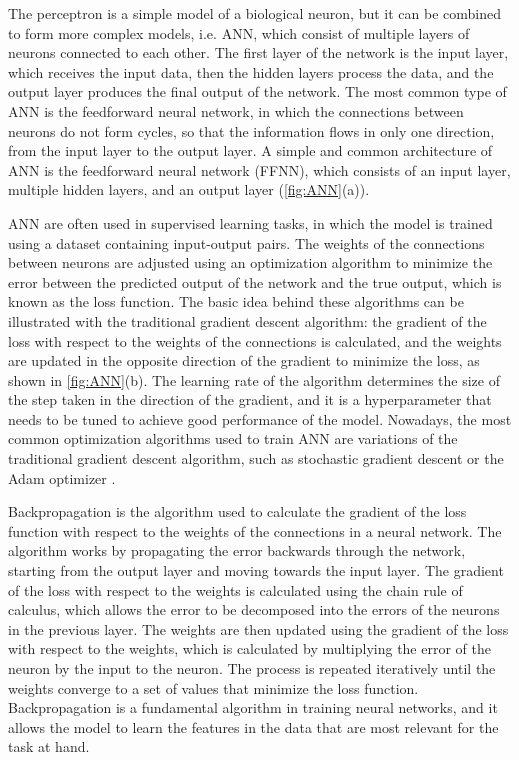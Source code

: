 The perceptron is a simple model of a biological neuron, but it can be
combined to form more complex models, i.e. ANN, which consist of multiple
layers of neurons connected to each other. The first layer of the network is
the input layer, which receives the input data, then the hidden layers process
the data, and the output layer produces the final output of the network. The
most common type of ANN is the feedforward neural network, in which the
connections between neurons do not form cycles, so that the information flows
in only one direction, from the input layer to the output layer. A simple and
common architecture of ANN is the feedforward neural network (FFNN), which
consists of an input layer, multiple hidden layers, and an output layer
(\cref{fig:ANN}(a)).

ANN are often used in supervised learning tasks, in which the model is trained
using a dataset containing input-output pairs. The weights of the connections
between neurons are adjusted using an optimization algorithm to minimize the
error between the predicted output of the network and the true output, which is
known as the loss function. The basic idea behind these algorithms can be
illustrated with the traditional gradient descent algorithm: the gradient of
the loss with respect to the weights of the connections is calculated, and the
weights are updated in the opposite direction of the gradient to minimize the
loss, as shown in \cref{fig:ANN}(b). The learning rate of the algorithm
determines the size of the step taken in the direction of the gradient, and it
is a hyperparameter that needs to be tuned to achieve good performance of the
model. Nowadays, the most common optimization algorithms used to train ANN are
variations of the traditional gradient descent algorithm, such as stochastic
gradient descent or the Adam optimizer \cite{Goodfellow2016}.

Backpropagation is the algorithm used to calculate the gradient of the loss
function with respect to the weights of the connections in a neural network.
The algorithm works by propagating the error backwards through the network,
starting from the output layer and moving towards the input layer. The
gradient of the loss with respect to the weights is calculated using the chain
rule of calculus, which allows the error to be decomposed into the errors of
the neurons in the previous layer. The weights are then updated using the
gradient of the loss with respect to the weights, which is calculated by
multiplying the error of the neuron by the input to the neuron. The process is
repeated iteratively until the weights converge to a set of values that
minimize the loss function. Backpropagation is a fundamental algorithm in
training neural networks, and it allows the model to learn the features in the
data that are most relevant for the task at hand.

